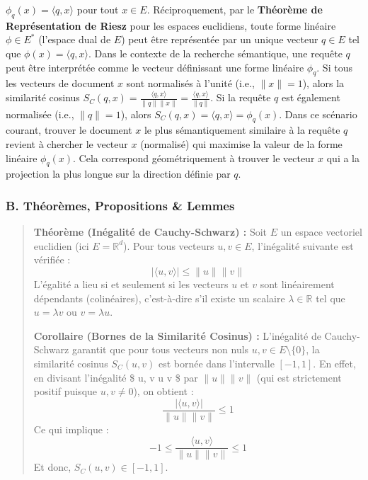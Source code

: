 \documentclass[11pt,a4paper]{report}
\begin{document}
\begin{enumerate}
  \(\phi_q(x) = \langle q, x \rangle\) pour tout \(x \in E\).
  Réciproquement, par le \textbf{Théorème de Représentation de Riesz}
  pour les espaces euclidiens, toute forme linéaire \(\phi \in E^*\)
  (l'espace dual de \(E\)) peut être représentée par un unique vecteur
  \(q \in E\) tel que \(\phi(x) = \langle q, x \rangle\). Dans le
  contexte de la recherche sémantique, une requête \(q\) peut être
  interprétée comme le vecteur définissant une forme linéaire
  \(\phi_q\). Si tous les vecteurs de document \(x\) sont normalisés à
  l'unité (i.e., \(\|x\|=1\)), alors la similarité cosinus
  \(S_C(q, x) = \frac{\langle q, x \rangle}{\|q\| \|x\|} = \frac{\langle q, x \rangle}{\|q\|}\).
  Si la requête \(q\) est également normalisée (i.e., \(\|q\|=1\)),
  alors \(S_C(q, x) = \langle q, x \rangle = \phi_q(x)\). Dans ce
  scénario courant, trouver le document \(x\) le plus sémantiquement
  similaire à la requête \(q\) revient à chercher le vecteur \(x\)
  (normalisé) qui maximise la valeur de la forme linéaire \(\phi_q(x)\).
  Cela correspond géométriquement à trouver le vecteur \(x\) qui a la
  projection la plus longue sur la direction définie par \(q\).
\end{enumerate}

\hypertarget{b.-thuxe9oruxe8mes-propositions-lemmes}{%
\subsubsection{B. Théorèmes, Propositions \&
Lemmes}\label{b.-thuxe9oruxe8mes-propositions-lemmes}}

\begin{quote}
\textbf{Théorème (Inégalité de Cauchy-Schwarz) :} Soit \(E\) un espace
vectoriel euclidien (ici \(E = \mathbb{R}^d\)). Pour tous vecteurs
\(u, v \in E\), l'inégalité suivante est vérifiée :
\[ | \langle u, v \rangle | \le \|u\| \|v\| \] L'égalité a lieu si et
seulement si les vecteurs \(u\) et \(v\) sont linéairement dépendants
(colinéaires), c'est-à-dire s'il existe un scalaire
\(\lambda \in \mathbb{R}\) tel que \(u = \lambda v\) ou
\(v = \lambda u\).

\textbf{Corollaire (Bornes de la Similarité Cosinus) :} L'inégalité de
Cauchy-Schwarz garantit que pour tous vecteurs non nuls
\(u, v \in E \setminus \{0\}\), la similarité cosinus \(S_C(u, v)\) est
bornée dans l'intervalle \([-1, 1]\). En effet, en divisant l'inégalité
\$ \textbar{} \langle u, v \rangle \textbar{} \le \textbar u\textbar{}
\textbar v\textbar{} \$ par \(\|u\| \|v\|\) (qui est strictement positif
puisque \(u, v \neq 0\)), on obtient :
\[ \frac{| \langle u, v \rangle |}{\|u\| \|v\|} \le 1 \] Ce qui implique
: \[ -1 \le \frac{\langle u, v \rangle}{\|u\| \|v\|} \le 1 \] Et donc,
\(S_C(u, v) \in [-1, 1]\).
\end{quote}
\end{document}
